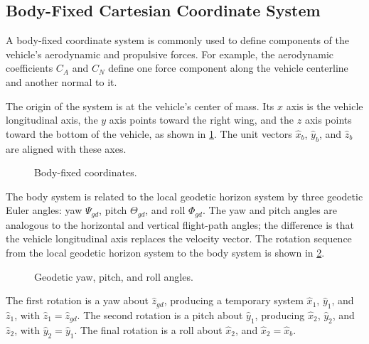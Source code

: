 \subsection{Body-Fixed Cartesian Coordinate System}\label{sec:body-fixed}

A body-fixed coordinate system is commonly used to define components of the
vehicle's aerodynamic and propulsive forces. For example, the aerodynamic
coefficients $C_A$ and $C_N$ define one force component along the vehicle
centerline and another normal to it.

The origin of the system is at the vehicle's center of mass. Its $x$ axis is the
vehicle longitudinal axis, the $y$ axis points toward the right wing, and the $z$
axis points toward the bottom of the vehicle, as shown in
\cref{fig:body-fixed-coordinates}. The unit vectors
$\hat{x}_b$, $\hat{y}_b$, and $\hat{z}_b$ are aligned with these axes.

\begin{figure}[htbp]
  \centering
  \resizebox{0.58\linewidth}{!}{}
  \caption{Body-fixed coordinates.}
  \label{fig:body-fixed-coordinates}
\end{figure}

The body system is related to the local geodetic horizon system by three geodetic
Euler angles: yaw $\Psi_{gd}$, pitch $\Theta_{gd}$, and roll $\Phi_{gd}$. The yaw
and pitch angles are analogous to the horizontal and vertical flight-path angles;
the difference is that the vehicle longitudinal axis replaces the velocity vector.
The rotation sequence from the local geodetic horizon system to the body system is
shown in \cref{fig:geodetic-euler-angles}.

\begin{figure}[htbp]
  \centering
  \resizebox{0.90\linewidth}{!}{}
  \caption{Geodetic yaw, pitch, and roll angles.}
  \label{fig:geodetic-euler-angles}
\end{figure}

The first rotation is a yaw about $\hat{z}_{gd}$, producing a temporary system
$\hat{x}_1$, $\hat{y}_1$, and $\hat{z}_1$, with
$\hat{z}_1=\hat{z}_{gd}$. The second rotation is a pitch about $\hat{y}_1$,
producing $\hat{x}_2$, $\hat{y}_2$, and $\hat{z}_2$, with
$\hat{y}_2=\hat{y}_1$. The final rotation is a roll about $\hat{x}_2$, and
$\hat{x}_2=\hat{x}_b$.

